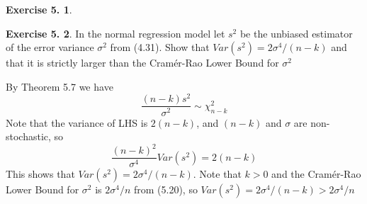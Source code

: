 \documentclass[12pt,letterpaper,reqno]{amsart}
\theoremstyle{plain}
\theoremstyle{definition}
\theoremstyle{definition}
\newtheorem{Exercise}{Exercise 5.}
\numberwithin{equation}{section}
\begin{document}
\begin{Exercise} \end{Exercise}

\begin{Exercise} In the normal regression model let $s^2$ be the unbiased estimator of the error variance $\sigma^2$ from (4.31). Show that $Var(s^2) = 2\sigma^4 / (n-k)$ and that it is strictly larger than the Cramér-Rao Lower Bound for $\sigma^2$

    By Theorem 5.7 we have
    \[
    \frac{(n-k)s^2}{\sigma^2} \sim \chi^2_{n-k}
    \]
    Note that the variance of LHS is $2(n-k)$, and $(n-k)$ and $\sigma$ are non-stochastic, so 
    \[
    \frac{(n-k)^2}{\sigma^4} Var(s^2) = 2(n-k)
    \]
    This shows that $Var(s^2) = 2\sigma^4 / (n-k)$. Note that $k>0$ and the Cramér-Rao Lower Bound for $\sigma^2$ is $2\sigma^4/n$ from (5.20), so $Var(s^2) = 2\sigma^4 / (n-k) > 2\sigma^4/n $

\end{Exercise}
\end{document}
